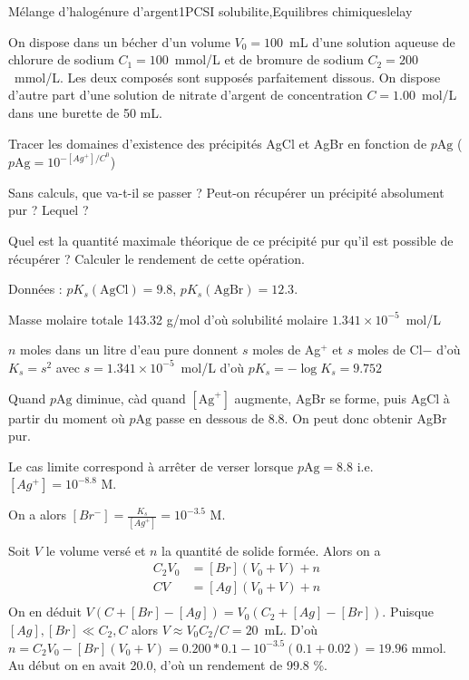 \begin{exercise}{Mélange d'halogénure d'argent}{1}{PCSI}
{solubilite,Equilibres chimiques}{lelay}

On dispose dans un bécher d’un volume $V_0 = 100$~mL d’une solution aqueuse de chlorure de sodium $C_1 = 100$~mmol/L et de bromure de sodium $C_2 = 200$~mmol/L. Les deux composés sont supposés parfaitement dissous. On dispose d’autre part d’une solution de nitrate d’argent de concentration $C = 1.00$~mol/L dans une burette de 50 mL.

\begin{questions}

    \question Tracer les domaines d'existence des précipités AgCl et AgBr en fonction de $p\text{Ag}$ ($p\text{Ag}=10^{-[Ag^+]/C^0}$)
    

    \question Sans calculs, que va-t-il se passer ? Peut-on récupérer un précipité absolument pur ? Lequel ?

    \question Quel est la quantité maximale théorique de ce précipité pur qu'il est possible de récupérer ? Calculer le rendement de cette opération.
    
\end{questions}
Données : $pK_s(\text{AgCl}) = 9.8$, $pK_s(\text{AgBr}) = 12.3$.
\end{exercise}

\begin{solution}
\begin{questions}

    \question Masse molaire totale 143.32 g/mol d'où solubilité molaire $1.341\times 10^{-5}$~mol/L
    
    $n$ moles dans un litre d'eau pure donnent $s$ moles de Ag$^{+}$ et $s$ moles de Cl${-}$ d'où $K_s = s^2$ avec $s = 1.341\times 10^{-5}$~mol/L d'où $pK_s = -\log K_s = 9.752$
    
    \question Quand $p\text{Ag}$ diminue, càd quand $[\text{Ag}^+]$ augmente, AgBr se forme, puis AgCl à partir du moment où $p\text{Ag}$ passe en dessous de 8.8. On peut donc obtenir AgBr pur.
    
    \question Le cas limite correspond à arrêter de verser lorsque $p\text{Ag} = 8.8$ i.e. $[Ag^+] = 10^{-8.8}$ M. 

    On a alors $[Br^-] = \frac{K_s}{[Ag^+]} = 10^{-3.5}$ M.

    Soit $V$ le volume versé et $n$ la quantité de solide formée. Alors on a 
    \begin{align*}
        C_2 V_0 &= [Br](V_0 + V) + n \\
        C V &= [Ag](V_0 + V) + n \\
    \end{align*}
    On en déduit $V(C+[Br]-[Ag]) = V_0(C_2 + [Ag]-[Br])$. Puisque $[Ag], [Br] \ll C_2, C$ alors $V\approx V_0 C_2/C = 20$~mL.
    D'où $n = C_2 V_0 - [Br] (V_0+V) = 0.200*0.1 - 10^{-3.5} (0.1 + 0.02) = 19.96$ mmol. Au début on en avait 20.0, d'où un rendement de 99.8 \%.
\end{questions}
\end{solution}